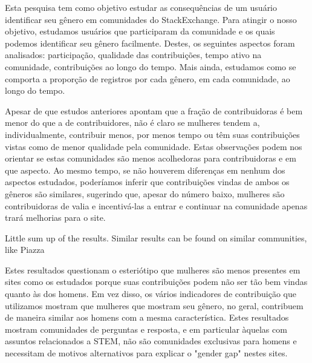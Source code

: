 Esta pesquisa tem como objetivo estudar as consequências de um usuário identificar seu gênero em comunidades do StackExchange. Para atingir o nosso objetivo, estudamos usuários que participaram da comunidade e os quais podemos identificar seu gênero facilmente. Destes, os seguintes aspectos foram analisados: participação, qualidade das contribuições, tempo ativo na comunidade, contribuições ao longo do tempo. Mais ainda, estudamos como se comporta a proporção de registros por cada gênero, em cada comunidade, ao longo do tempo.

Apesar de que estudos anteriores apontam que a fração de contribuidoras é bem menor do que a de contribuidores, não é claro se mulheres tendem a, individualmente, contribuir menos, por menos tempo ou têm suas contribuições vistas como de menor qualidade pela comunidade. Estas observações podem nos orientar se estas comunidades são menos acolhedoras para contribuidoras e em que aspecto. Ao mesmo tempo, se não houverem diferenças em nenhum dos aspectos estudados, poderíamos inferir que contribuições vindas de ambos os gêneros são similares, sugerindo que, apesar do número baixo, mulheres são contribuidoras de valia e incentivá-las a entrar e continuar na comunidade apenas trará melhorias para o site.

Little sum up of the results. Similar results can be found on similar communities, like Piazza\cite{piazza:report}

Estes resultados questionam o esteriótipo que mulheres são menos presentes em sites como os estudados porque suas contribuições podem não ser tão bem vindas quanto às dos homens. Em vez disso, os vários indicadores de contribuição que utilizamos mostram que mulheres que mostram seu gênero, no geral, contribuem de maneira similar aos homens com a mesma característica. Estes resultados mostram comunidades de perguntas e resposta, e em particular àquelas com assuntos relacionados a STEM, não são comunidades exclusivas para homens e necessitam de motivos alternativos para explicar o "gender gap" nestes sites. 


